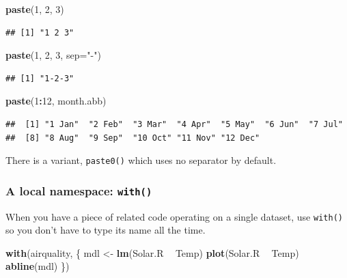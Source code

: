 \documentclass[]{book}
\newenvironment{Shaded}{\begin{snugshade}}{\end{snugshade}}
\newcommand{\DataTypeTok}[1]{\textcolor[rgb]{0.13,0.29,0.53}{#1}}
\newcommand{\DecValTok}[1]{\textcolor[rgb]{0.00,0.00,0.81}{#1}}
\newcommand{\KeywordTok}[1]{\textcolor[rgb]{0.13,0.29,0.53}{\textbf{#1}}}
\newcommand{\NormalTok}[1]{#1}
\newcommand{\OperatorTok}[1]{\textcolor[rgb]{0.81,0.36,0.00}{\textbf{#1}}}
\newcommand{\StringTok}[1]{\textcolor[rgb]{0.31,0.60,0.02}{#1}}
\begin{document}
\begin{Shaded}
\begin{Highlighting}[]
\KeywordTok{paste}\NormalTok{(}\DecValTok{1}\NormalTok{, }\DecValTok{2}\NormalTok{, }\DecValTok{3}\NormalTok{)}
\end{Highlighting}
\end{Shaded}

\begin{verbatim}
## [1] "1 2 3"
\end{verbatim}

\begin{Shaded}
\begin{Highlighting}[]
\KeywordTok{paste}\NormalTok{(}\DecValTok{1}\NormalTok{, }\DecValTok{2}\NormalTok{, }\DecValTok{3}\NormalTok{, }\DataTypeTok{sep=}\StringTok{"-"}\NormalTok{)}
\end{Highlighting}
\end{Shaded}

\begin{verbatim}
## [1] "1-2-3"
\end{verbatim}

\begin{Shaded}
\begin{Highlighting}[]
\KeywordTok{paste}\NormalTok{(}\DecValTok{1}\OperatorTok{:}\DecValTok{12}\NormalTok{, month.abb)}
\end{Highlighting}
\end{Shaded}

\begin{verbatim}
##  [1] "1 Jan"  "2 Feb"  "3 Mar"  "4 Apr"  "5 May"  "6 Jun"  "7 Jul" 
##  [8] "8 Aug"  "9 Sep"  "10 Oct" "11 Nov" "12 Dec"
\end{verbatim}

There is a variant, \texttt{paste0()} which uses no separator by default.

\hypertarget{a-local-namespace-with}{%
\subsubsection*{\texorpdfstring{A local namespace: \texttt{with()}}{A local namespace: with()}}\label{a-local-namespace-with}}

When you have a piece of related code operating on a single dataset, use \texttt{with()} so you don't have to type its name all the time.

\begin{Shaded}
\begin{Highlighting}[]
\KeywordTok{with}\NormalTok{(airquality, \{}
\NormalTok{  mdl <-}\StringTok{ }\KeywordTok{lm}\NormalTok{(Solar.R }\OperatorTok{~}\StringTok{ }\NormalTok{Temp)}
  \KeywordTok{plot}\NormalTok{(Solar.R }\OperatorTok{~}\StringTok{ }\NormalTok{Temp)}
  \KeywordTok{abline}\NormalTok{(mdl)}
\NormalTok{\})}
\end{Highlighting}
\end{Shaded}
\end{document}
